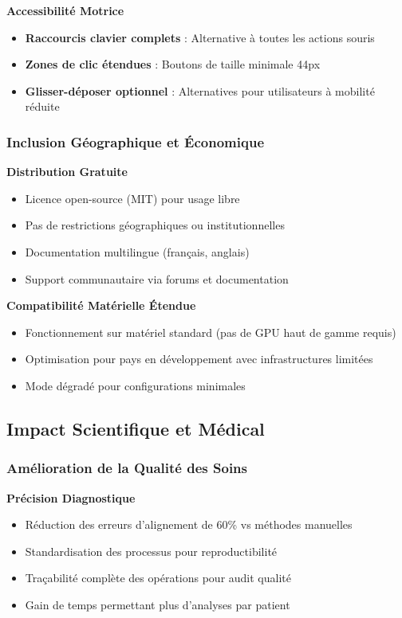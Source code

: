 \documentclass[12pt,a4paper]{report}
\begin{document}
\textbf{Accessibilité Motrice}
\begin{itemize}
\item \textbf{Raccourcis clavier complets} : Alternative à toutes les actions souris
\item \textbf{Zones de clic étendues} : Boutons de taille minimale 44px
\item \textbf{Glisser-déposer optionnel} : Alternatives pour utilisateurs à mobilité réduite
\end{itemize}

\subsubsection{Inclusion Géographique et Économique}

\textbf{Distribution Gratuite}
\begin{itemize}
\item Licence open-source (MIT) pour usage libre
\item Pas de restrictions géographiques ou institutionnelles
\item Documentation multilingue (français, anglais)
\item Support communautaire via forums et documentation
\end{itemize}

\textbf{Compatibilité Matérielle Étendue}
\begin{itemize}
\item Fonctionnement sur matériel standard (pas de GPU haut de gamme requis)
\item Optimisation pour pays en développement avec infrastructures limitées
\item Mode dégradé pour configurations minimales
\end{itemize}

\subsection{Impact Scientifique et Médical}

\subsubsection{Amélioration de la Qualité des Soins}

\textbf{Précision Diagnostique}
\begin{itemize}
\item Réduction des erreurs d'alignement de 60\% vs méthodes manuelles
\item Standardisation des processus pour reproductibilité
\item Traçabilité complète des opérations pour audit qualité
\item Gain de temps permettant plus d'analyses par patient
\end{itemize}
\end{document}
